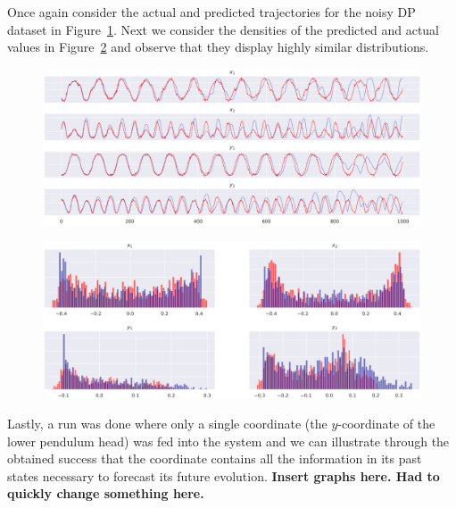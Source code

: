 Once again consider the actual and predicted trajectories for the noisy DP dataset in Figure~\ref{fig:noisydp_success_traj}. Next we consider the densities of the predicted and actual values in Figure~\ref{fig:noisydp_success_density} and observe that they display highly similar distributions.

\begin{figure}[ht]
  \centering
  \includegraphics[width=0.95\linewidth]{Graphs/_dp_noise_FigCD_2030.eps} 
 \label{fig:noisydp_success_traj}
\end{figure}
\begin{figure}[ht]
  \centering
  \includegraphics[width=\linewidth]{Graphs/_dp_noise_2B_2030.eps}
  \label{fig:noisydp_success_density}
 \end{figure}

 Lastly, a run was done where only a single coordinate (the $y$-coordinate of the lower pendulum head) was fed into the system and we can illustrate through the obtained success that the coordinate contains all the information in its past states necessary to forecast its future evolution.
 \textbf{Insert graphs here. Had to quickly change something here.}
 

